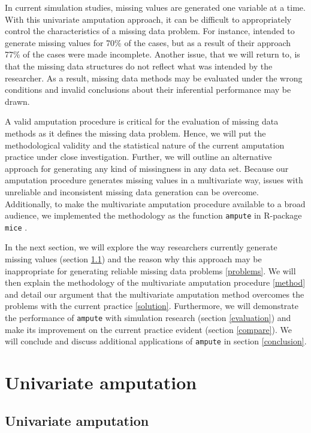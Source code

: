 \documentclass[]{interact}
\newcommand{\code}[1]{\texttt{#1}}
\begin{document}
In current simulation studies, missing values are generated one variable at a time. With this univariate amputation approach, it can be difficult to appropriately control the characteristics of a missing data problem. For instance, \citep[][p. 11]{Seaman2012} intended to generate missing values for 70\% of the cases, but as a result of their approach 77\% of the cases were made incomplete. Another issue, that we will return to, is that the missing data structures do not reflect what was intended by the researcher. As a result, missing data methods may be evaluated under the wrong conditions and invalid conclusions about their inferential performance may be drawn. 

A valid amputation procedure is critical for the evaluation of missing data methods as it defines the missing data problem. Hence, we will put the methodological validity and the statistical nature of the current amputation practice under close investigation. Further, we will outline an alternative approach for generating any kind of missingness in any data set. Because our amputation procedure generates missing values in a multivariate way, issues with unreliable and inconsistent missing data generation can be overcome. Additionally, to make the multivariate amputation procedure available to a broad audience, we implemented the methodology as the function \code{ampute} \citep{AmputeVignette} in R-package \code{mice} \citep{Stef2011}. 

In the next section, we will explore the way researchers currently generate missing values (section \ref{current}) and the reason why this approach may be inappropriate for generating reliable missing data problems \eqref{problems}. We will then explain the methodology of the multivariate amputation procedure \eqref{method} and detail our argument that the multivariate amputation method overcomes the problems with the current practice \eqref{solution}. Furthermore, we will demonstrate the performance of \code{ampute} with simulation research (section \ref{evaluation}) and make its improvement on the current practice evident (section \ref{compare}). We will conclude and discuss additional applications of \code{ampute} in section \ref{conclusion}. 

\section{Univariate amputation}

\subsection{\normalsize Univariate amputation}\label{current}
\end{document}
